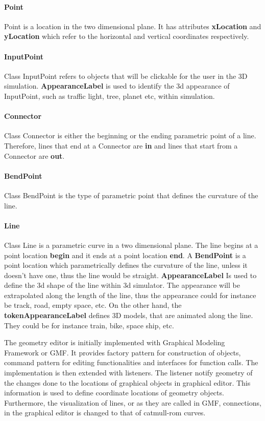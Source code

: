 \paragraph{Point}
Point is a location in the two dimensional plane. It has attributes \textbf{xLocation} and \textbf{yLocation} which refer to the horizontal and vertical coordinates respectively.

\paragraph{InputPoint}
Class InputPoint refers to objects that will be clickable for the user in the 3D simulation. \textbf{AppearanceLabel} is used to identify the 3d appearance of InputPoint, such as traffic light, tree, planet etc, within simulation.

\paragraph{Connector}
Class Connector is either the beginning or the ending parametric point of a line. Therefore, lines that end at a Connector are \textbf{in} and lines that start from a Connector are \textbf{out}.

\paragraph{BendPoint}
Class BendPoint is the type of parametric point that defines the curvature of the line.

\paragraph{Line}
Class Line is a parametric curve in a two dimensional plane. The line begins at a point location \textbf{begin} and it ends at a point location \textbf{end}. A \textbf{BendPoint} is a point location which parametrically defines the curvature of the line, unless it doesn't have one, thus the line would be straight. \textbf{AppearanceLabel} Is used to define the 3d shape of the line within 3d simulator. The appearance will be extrapolated along the length of the line, thus the appearance could for instance be track, road, empty space, etc. On the other hand, the \textbf{tokenAppearanceLabel} defines 3D models, that are animated along the line. They could be for instance train, bike, space ship, etc.

The geometry editor is initially implemented with Graphical Modeling Framework or GMF. It provides factory pattern for construction of objects, command pattern for editing functionalities and interfaces for function calls. The implementation is then extended with listeners. The listener notify geometry of the changes done to the locations of graphical objects in graphical editor. This information is used to define coordinate locations of geometry objects. Furthermore, the visualization of lines, or as they are called in GMF, connections, in the graphical editor is changed to that of catmull-rom curves. 





